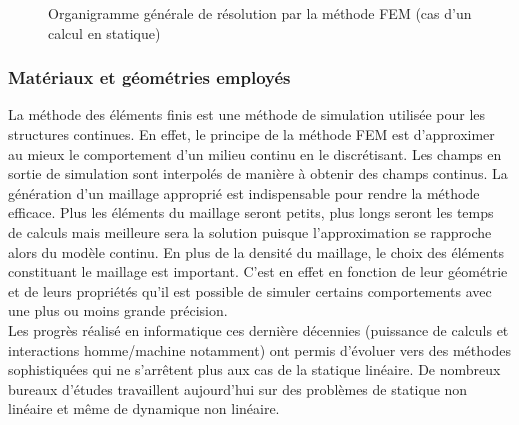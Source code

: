 \begin{figure}
				\caption{\label{fig03:methode_FEM}Organigramme générale de résolution par la méthode FEM (cas d'un calcul en statique) \citep{cazenave_methode_2013}}
			\end{figure}
		\subsubsection{Matériaux et géométries employés}
			La méthode des éléments finis est une méthode de simulation utilisée pour les structures continues. En effet, le principe de la méthode FEM est d'approximer au mieux le comportement d'un milieu continu en le discrétisant. Les champs en sortie de simulation sont interpolés de manière à obtenir des champs continus. La génération d'un maillage approprié est indispensable pour rendre la méthode efficace. Plus les éléments du maillage seront petits, plus longs seront les temps de calculs mais meilleure sera la solution puisque l'approximation se rapproche alors du modèle continu. En plus de la densité du maillage, le choix des éléments constituant le maillage est important. C'est en effet en fonction de leur géométrie et de leurs propriétés qu'il est possible de simuler certains comportements avec une plus ou moins grande précision.
			\\Les progrès réalisé en informatique ces dernière décennies (puissance de calculs et interactions homme/machine notamment) ont permis d'évoluer vers des méthodes sophistiquées qui ne s'arrêtent plus aux cas de la statique linéaire. De nombreux bureaux d'études travaillent aujourd’hui sur des problèmes de statique non linéaire et même de dynamique non linéaire.
